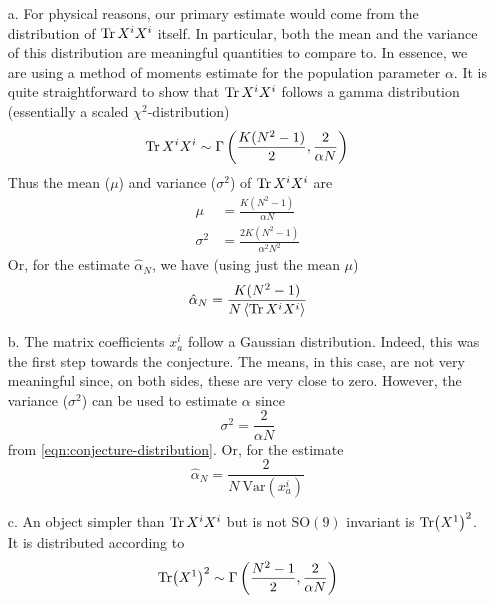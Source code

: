\begin{enumerate}
    \item[a.] {
        For physical reasons, our primary estimate would come from the distribution of $\Tr X^i X^i$ itself. In particular, both the mean and the variance of this distribution are meaningful quantities to compare to. In essence, we are using a method of moments estimate for the population parameter $\alpha$. It is quite straightforward to show that $\Tr X^i X^i$ follows a gamma distribution (essentially a scaled $\chi^2$-distribution)
        \begin{equation}
            \Tr X^i X^i \sim \Gamma \left( \frac{K(N^2-1)}{2}, \frac{2}{\alpha N} \right)
        \end{equation}
        Thus the mean ($\mu$) and variance ($\sigma^2$) of $\Tr X^i X^i$ are
        \begin{align}
            \mu &= \frac{K(N^2-1)}{\alpha N} \\
            \sigma^2 &= \frac{2K(N^2-1)}{\alpha^2 N^2}
        \end{align}
        Or, for the estimate $\hat{\alpha}_N$, we have (using just the mean $\mu$)
        \begin{align}
            \hat{\alpha}_N = \frac{K(N^2 - 1)}{N \expval{\Tr X^i X^i}}
        \end{align}
    }
    \item[b.] {
        The matrix coefficients $x^{i}_a$ follow a Gaussian distribution. Indeed, this was the first step towards the conjecture. The means, in this case, are not very meaningful since, on both sides, these are very close to zero. However, the variance ($\sigma^2$) can be used to estimate $\alpha$ since
        \begin{equation}
            \sigma^2 = \frac{2}{\alpha N}
        \end{equation}
        from \cref{eqn:conjecture-distribution}. Or, for the estimate
        \begin{equation}
            \hat{\alpha}_N = \frac{2}{N \ \mathrm{Var}\left( x^i_a \right)}
        \end{equation}
    }
    \item[c.] {
        An object simpler than $\Tr X^i X^i$ but is not $\mathrm{SO}(9)$ invariant is $\Tr (X^1)^2$. It is distributed according to
        \begin{equation}
            \Tr (X^1)^2 \sim \Gamma \left( \frac{N^2-1}{2}, \frac{2}{\alpha N}\right)
        \end{equation}
}
\end{enumerate}
